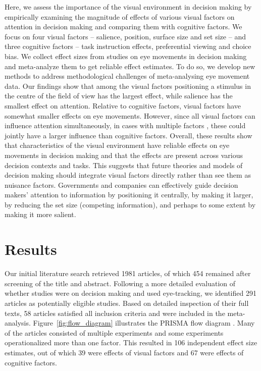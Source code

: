 \documentclass[english,natbib,man,floatsintext]{apa6}
\begin{document}
Here, we assess the importance of the visual environment in decision making by empirically examining the magnitude of effects of various visual factors on attention in decision making and comparing them with cognitive factors. We focus on four visual factors -- salience, position, surface size and set size -- and three cognitive factors -- task instruction effects, preferential viewing and choice bias. We collect effect sizes from studies on eye movements in decision making and meta-analyze them to get reliable effect estimates. To do so, we develop new methods to address methodological challenges of meta-analysing eye movement data. Our findings show that among the visual factors positioning a stimulus in the centre of the field of view has the largest effect, while salience has the smallest effect on attention. Relative to cognitive factors, visual factors have somewhat smaller effects on eye movements. However, since all visual factors can influence attention simultaneously, in cases with multiple factors \citep{gidloef2017a, orquin2019a}, these could jointly have a larger influence than cognitive factors. Overall, these results show that characteristics of the visual environment have reliable effects on eye movements in decision making and that the effects are present across various decision contexts and tasks. This suggests that future theories and models of decision making should integrate visual factors directly rather than see them as nuisance factors. Governments and companies can effectively guide decision makers' attention to information by positioning it centrally, by making it larger, by reducing the set size (competing information), and perhaps to some extent by making it more salient.  



\section{Results}

Our initial literature search retrieved 1981 articles, of which 454 remained after screening of the title and abstract. Following a more detailed evaluation of whether studies were on decision making and used eye-tracking, we identified 291 articles as potentially eligible studies. Based on detailed inspection of their full texts, 58 articles satisfied all inclusion criteria and were included in the meta-analysis. Figure~\ref{fig:flow_diagram} illustrates the PRISMA flow diagram \citep{moher2009preferred}. Many of the articles consisted of multiple experiments and some experiments operationalized more than one factor. This resulted in 106 independent effect size estimates, out of which 39 were effects of visual factors and 67 were effects of cognitive factors.
\end{document}
